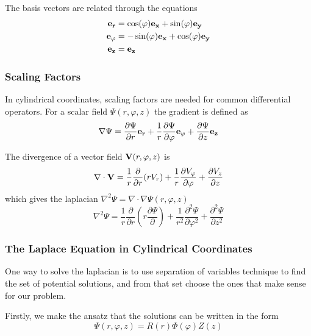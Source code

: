 The basis vectors are related through the equations
\begin{align}
    \vb{e_r}   & = \cos(\varphi)\vb{e_x} + \sin(\varphi)\vb{e_y}  \\
    \vb{e_\varphi} & = -\sin(\varphi)\vb{e_x} + \cos(\varphi)\vb{e_y} \\
    \vb{e_z}   & = \vb{e_z}
\end{align}

\subsubsection{Scaling Factors}
In cylindrical coordinates, scaling factors are needed for
common differential operators. For a scalar field $\Psi(r, \varphi, z)$
the gradient is defined as
\begin{equation}
    \nabla \Psi = \frac{\partial \Psi}{\partial r} \vb{e_r} +
    \frac{1}{r} \frac{\partial \Psi}{\partial \varphi} \vb{e_\varphi} +
    \frac{\partial \Psi}{\partial z} \vb{e_z}
    \label{eq:cylgrad}
\end{equation}

The divergence of a vector field $\vb{V}(r, \varphi, z)$ is
\begin{equation}
    \nabla \cdot \vb{V} = \frac{1}{r} \frac{\partial}{\partial r} (rV_r)
    + \frac{1}{r} \frac{\partial V_\varphi}{\partial \varphi}
    + \frac{\partial V_z}{\partial z}
    \label{eq:cyldiv}
\end{equation}
which gives the laplacian $\nabla^2 \Psi = \nabla \cdot \nabla \Psi (r, \varphi, z)$
\begin{equation}
    \nabla^2 \Psi =
    \frac{1}{r} \frac{\partial}{\partial r} \left(r\frac{\partial \Psi}{\partial}\right)
    + \frac{1}{r^2} \frac{\partial^2 \Psi}{\partial \varphi^2}
    + \frac{\partial^2 \Psi}{\partial z^2}
    \label{eq:cyl_laplacian}
\end{equation}
\cite[Ch.3.13]{russenschuck_field_2011}
\subsubsection{The Laplace Equation in Cylindrical Coordinates}
One way to solve the laplacian is to use separation of variables
technique to find the set of potential solutions, and from that
set choose the ones that make sense for our problem.

Firstly, we make the ansatz that the solutions can be written in
the form
\begin{equation}
    \Psi(r, \varphi, z) = R(r)\varPhi(\varphi)Z(z)
    \label{eq:psi_ansatz}
\end{equation}

